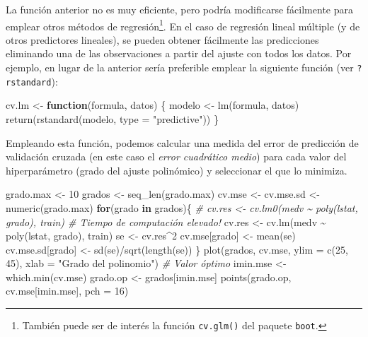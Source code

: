 \documentclass[
  spanish,
]{book}
\newenvironment{Shaded}{\begin{snugshade}}{\end{snugshade}}
\newcommand{\AttributeTok}[1]{\textcolor[rgb]{0.77,0.63,0.00}{#1}}
\newcommand{\CommentTok}[1]{\textcolor[rgb]{0.56,0.35,0.01}{\textit{#1}}}
\newcommand{\ControlFlowTok}[1]{\textcolor[rgb]{0.13,0.29,0.53}{\textbf{#1}}}
\newcommand{\DecValTok}[1]{\textcolor[rgb]{0.00,0.00,0.81}{#1}}
\newcommand{\FunctionTok}[1]{\textcolor[rgb]{0.00,0.00,0.00}{#1}}
\newcommand{\NormalTok}[1]{#1}
\newcommand{\OtherTok}[1]{\textcolor[rgb]{0.56,0.35,0.01}{#1}}
\newcommand{\SpecialCharTok}[1]{\textcolor[rgb]{0.00,0.00,0.00}{#1}}
\newcommand{\StringTok}[1]{\textcolor[rgb]{0.31,0.60,0.02}{#1}}
\theoremstyle{break}
\theoremstyle{definition}
\theoremstyle{definition}
\theoremstyle{definition}
\theoremstyle{definition}
\theoremstyle{remark}
\begin{document}
La función anterior no es muy eficiente, pero podría modificarse fácilmente para emplear otros métodos de regresión\footnote{También puede ser de interés la función \texttt{cv.glm()} del paquete \texttt{boot}.}.
En el caso de regresión lineal múltiple (y de otros predictores lineales), se pueden obtener fácilmente las predicciones eliminando una de las observaciones a partir del ajuste con todos los datos.
Por ejemplo, en lugar de la anterior sería preferible emplear la siguiente función (ver \texttt{?rstandard}):

\begin{Shaded}
\begin{Highlighting}[]
\NormalTok{cv.lm }\OtherTok{\textless{}{-}} \ControlFlowTok{function}\NormalTok{(formula, datos) \{}
\NormalTok{    modelo }\OtherTok{\textless{}{-}} \FunctionTok{lm}\NormalTok{(formula, datos)}
    \FunctionTok{return}\NormalTok{(}\FunctionTok{rstandard}\NormalTok{(modelo, }\AttributeTok{type =} \StringTok{"predictive"}\NormalTok{))}
\NormalTok{\}}
\end{Highlighting}
\end{Shaded}

Empleando esta función, podemos calcular una medida del error de predicción de validación cruzada (en este caso el \emph{error cuadrático medio}) para cada valor del hiperparámetro (grado del ajuste polinómico) y seleccionar el que lo minimiza.

\begin{Shaded}
\begin{Highlighting}[]
\NormalTok{grado.max }\OtherTok{\textless{}{-}} \DecValTok{10}
\NormalTok{grados }\OtherTok{\textless{}{-}} \FunctionTok{seq\_len}\NormalTok{(grado.max) }
\NormalTok{cv.mse }\OtherTok{\textless{}{-}}\NormalTok{ cv.mse.sd }\OtherTok{\textless{}{-}} \FunctionTok{numeric}\NormalTok{(grado.max)}
\ControlFlowTok{for}\NormalTok{(grado }\ControlFlowTok{in}\NormalTok{ grados)\{}
  \CommentTok{\# cv.res \textless{}{-} cv.lm0(medv \textasciitilde{} poly(lstat, grado), train) \# Tiempo de computación elevado!}
\NormalTok{  cv.res }\OtherTok{\textless{}{-}} \FunctionTok{cv.lm}\NormalTok{(medv }\SpecialCharTok{\textasciitilde{}} \FunctionTok{poly}\NormalTok{(lstat, grado), train)}
\NormalTok{  se }\OtherTok{\textless{}{-}}\NormalTok{ cv.res}\SpecialCharTok{\^{}}\DecValTok{2}
\NormalTok{  cv.mse[grado] }\OtherTok{\textless{}{-}} \FunctionTok{mean}\NormalTok{(se)}
\NormalTok{  cv.mse.sd[grado] }\OtherTok{\textless{}{-}} \FunctionTok{sd}\NormalTok{(se)}\SpecialCharTok{/}\FunctionTok{sqrt}\NormalTok{(}\FunctionTok{length}\NormalTok{(se))}
\NormalTok{\}}
\FunctionTok{plot}\NormalTok{(grados, cv.mse, }\AttributeTok{ylim =} \FunctionTok{c}\NormalTok{(}\DecValTok{25}\NormalTok{, }\DecValTok{45}\NormalTok{),}
  \AttributeTok{xlab =} \StringTok{"Grado del polinomio"}\NormalTok{)}
\CommentTok{\# Valor óptimo}
\NormalTok{imin.mse }\OtherTok{\textless{}{-}} \FunctionTok{which.min}\NormalTok{(cv.mse)}
\NormalTok{grado.op }\OtherTok{\textless{}{-}}\NormalTok{ grados[imin.mse]}
\FunctionTok{points}\NormalTok{(grado.op, cv.mse[imin.mse], }\AttributeTok{pch =} \DecValTok{16}\NormalTok{)}
\end{Highlighting}
\end{Shaded}
\end{document}
